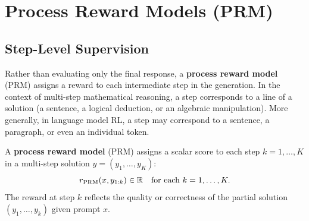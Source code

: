 \section{Process Reward Models (PRM)}
\label{sec:prm}

\subsection{Step-Level Supervision}

Rather than evaluating only the final response, a \textbf{process reward model} (PRM) assigns a reward to each intermediate step in the generation. In the context of multi-step mathematical reasoning, a step corresponds to a line of a solution (a sentence, a logical deduction, or an algebraic manipulation). More generally, in language model RL, a step may correspond to a sentence, a paragraph, or even an individual token.

\begin{definition}
\label{def:prm}
A \textbf{process reward model} (PRM) assigns a scalar score to each step $k = 1, \ldots, K$ in a multi-step solution $y = (y_1, \ldots, y_K)$:
\[
r_{\mathrm{PRM}}(x, y_{1:k}) \in \mathbb{R} \quad \text{for each } k = 1, \ldots, K.
\]
The reward at step $k$ reflects the quality or correctness of the partial solution $(y_1, \ldots, y_k)$ given prompt $x$.
\end{definition}

